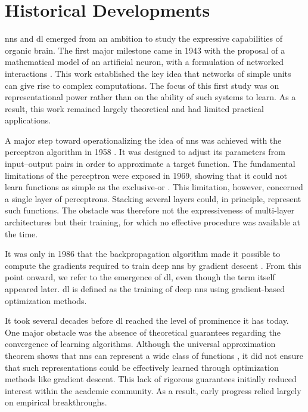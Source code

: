 \section{Historical Developments}\label{sec:deep_learning_historical_developments}



\glspl{nn} and \gls{dl} emerged from an ambition to study the expressive capabilities of organic brain.
The first major milestone came in 1943 with the proposal of a mathematical model of an artificial neuron, with a formulation of networked interactions \parencite{mcculloch1943logical}.
This work established the key idea that networks of simple units can give rise to complex computations.
The focus of this first study was on representational power rather than on the ability of such systems to learn.
As a result, this work remained largely theoretical and had limited practical applications.

A major step toward operationalizing the idea of \glspl{nn} was achieved with the perceptron algorithm in 1958 \parencite{rosenblatt1958perceptron}.
It was designed to adjust its parameters from input–output pairs in order to approximate a target function.
The fundamental limitations of the perceptron were exposed in 1969, showing that it could not learn functions as simple as the exclusive-or \parencite{minsky1969introduction}.
This limitation, however, concerned a single layer of perceptrons.
Stacking several layers could, in principle, represent such functions.
The obstacle was therefore not the expressiveness of multi-layer architectures but their training, for which no effective procedure was available at the time.

It was only in 1986 that the backpropagation algorithm made it possible to compute the gradients required to train deep \glspl{nn} by gradient descent \parencite{rumelhart1986learning}.
From this point onward, we refer to the emergence of \gls{dl}, even though the term itself appeared later.
\gls{dl} is defined as the training of deep \glspl{nn} using gradient-based optimization methods.

It took several decades before \gls{dl} reached the level of prominence it has today.
One major obstacle was the absence of theoretical guarantees regarding the convergence of learning algorithms.
Although the universal approximation theorem shows that \glspl{nn} can represent a wide class of functions \parencite{hornik1989multilayer}, it did not ensure that such representations could be effectively learned through optimization methods like gradient descent.
This lack of rigorous guarantees initially reduced interest within the academic community.
As a result, early progress relied largely on empirical breakthroughs.

